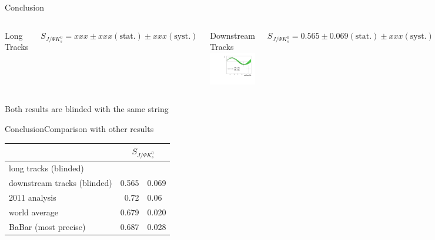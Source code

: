 \documentclass{beamer}
\newcommand{\SJPsi}{S_{J/\Psi K_s^0}}
\begin{document}
\begin{frame}{Conclusion}
	\begin{columns}
	\begin{block}{Long Tracks}
	\centering
	\end{block}
	$\SJPsi = xxx \pm xxx (\text{stat.}) \pm xxx (\text{syst.})$
	\begin{block}{Downstream Tracks}
	\centering
	\includegraphics[width=\textwidth]{asymmetry_ds}
	\end{block}
	$\SJPsi = 0.565 \pm 0.069 (\text{stat.}) \pm xxx (\text{syst.})$
	\end{columns}
    \begin{center}
    Both results are blinded with the same string
    \end{center}
\end{frame}

\begin{frame}{Conclusion}{Comparison with other results}
\begin{center}
\begin{tabular}{l r@{$\pm$}l}
\hline \hline
& \multicolumn{2}{c}{$\SJPsi$} \\ \hline
long tracks (blinded) & & \\
downstream tracks (blinded) & 0.565 & 0.069 \\ \hline
2011 analysis & 0.72 & 0.06 \\
world average & 0.679 & 0.020 \\
BaBar (most precise) & 0.687 & 0.028 \\ \hline \hline
\end{tabular}
\end{center}
\end{frame}



\end{document}
